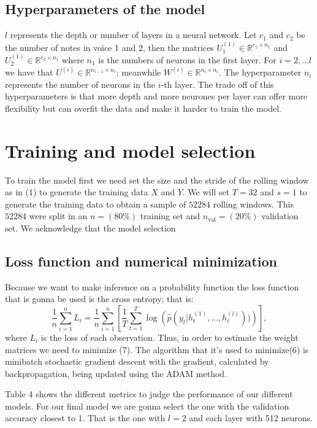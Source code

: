 \documentclass{article}
\begin{document}
\subsection*{Hyperparameters of the model}
$l$ represents the depth or number of layers in a neural network. Let $c_1$ and $c_2$ be the number of notes in voice 1 and 2, then the matrices $U^{(1)}_1\in\mathbb{R}^{c_1\times n_1}$ and $U^{(1)}_2\in\mathbb{R}^{c_2\times n_1}$ where $n_{1}$ is the numbers of neurons in the first layer. For $i=2,\dots l$ we have that $U^{(i)}\in\mathbb{R}^{n_{i-1}\times n_i}$; meanwhile $W^{(i)}\in\mathbb{R}^{n_i\times n_i}$. The hyperparameter $n_i$ represents the number of neurons in the $i$-th layer. The trade off of this hyperparameters is that more depth and more neurones per layer can offer more flexibility but can overfit the data and make it harder to train the model. 



\section*{Training and model selection}

To train the model first we need set the size and the stride of the rolling window as in (1) to generate the training data $X$ and $Y$. We will set $T = 32$ and $s=1$ to generate the training data to obtain a sample of $52284$ rolling windows. This $52284$ were split in an $n = (80\%)$ training set and $n_{\mbox{val}} = (20\%)$ validation set. We acknowledge that the model selection
\subsection*{Loss function and numerical minimization}
Because we want to make inference on a probability function the loss function that is gonna be used is the cross entropy; that is:
\begin{equation}
\frac{1}{n} \sum_{i=1}^nL_i =\frac{1}{n} \sum_{i=1}^n \left[\frac{1}{T}\sum_{t= 1}^T\log\left(\hat{p}(y_t|h^{(1)}_t,\dots,h^{(l)}_t))\right)\right],
\end{equation}
where $L_i$ is the loss of each observation. Thus, in order to estimate the weight matrices we need to minimize (7). The algorithm that it's used to minimize(6) is minibatch stochastic gradient descent with the gradient, calculated by backpropagation, being updated using the ADAM method.

Table 4 shows the different metrics to judge the performance of our different models. For our final model we are gonna select the one with the validation accuracy closest to 1. That is the one with $l=2$ and each layer with 512 neurons. 
\end{document}

